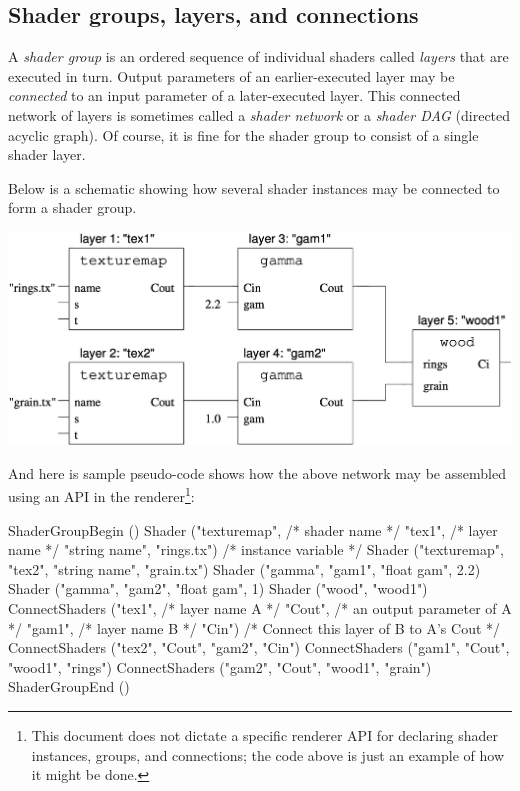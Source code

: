 \documentclass[11pt,letterpaper]{book}
\begin{document}
\medskip



\subsection*{Shader groups, layers, and connections}

A \emph{shader group} is an ordered sequence of
individual shaders called \emph{layers}
that are executed in turn.  Output parameters of an earlier-executed layer
may be \emph{connected} to an input parameter of a later-executed layer.
This connected network of layers is sometimes called a \emph{shader network}
or a \emph{shader DAG} (directed acyclic graph).  Of course, it is fine for
the shader group to consist of a single shader layer.

Below is a schematic showing how several shader instances may be
connected to form a shader group.

\bigskip

\noindent \includegraphics{Figures/groupschematic}

\bigskip

\noindent And here is sample pseudo-code shows how the above network may
be assembled using an API in the renderer\footnote{This document does
not dictate a specific renderer API for declaring shader instances,
groups, and connections; the code above is just an example of how
it might be done.}:

\begin{code}
    ShaderGroupBegin ()
    Shader ("texturemap",               /* shader name */
            "tex1",                     /* layer name */
            "string name", "rings.tx")  /* instance variable */
    Shader ("texturemap", "tex2", "string name", "grain.tx")
    Shader ("gamma", "gam1", "float gam", 2.2)
    Shader ("gamma", "gam2", "float gam", 1)
    Shader ("wood", "wood1")
    ConnectShaders ("tex1",     /* layer name A */
                    "Cout",     /* an output parameter of A */
                    "gam1",     /* layer name B */
                    "Cin")      /* Connect this layer of B to A's Cout */
    ConnectShaders ("tex2", "Cout", "gam2", "Cin")
    ConnectShaders ("gam1", "Cout", "wood1", "rings")
    ConnectShaders ("gam2", "Cout", "wood1", "grain")
    ShaderGroupEnd ()
\end{code}
\end{document}
